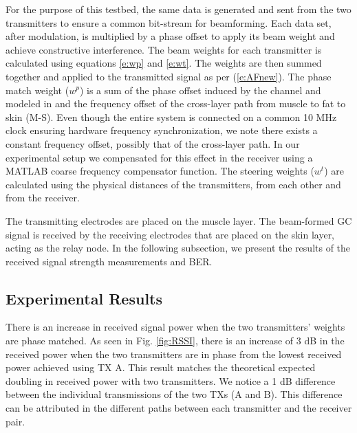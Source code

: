 For the purpose of this testbed, the same data is generated and sent from the two transmitters to ensure a common bit-stream for beamforming. 
Each data set, after modulation, is multiplied by a phase offset to apply its beam weight and achieve constructive interference.
The beam weights for each transmitter is calculated using equations \ref{e:wp} and \ref{e:wt}. The weights are then summed together and applied to the transmitted signal as per (\ref{e:AFnew}). The phase match weight  ($w^p$) is a sum of the phase offset induced by the channel and modeled in \cite{tbiocas} and the frequency offset of the cross-layer path from muscle to fat to skin (M-S).
Even though the entire system is connected on a common 10 MHz clock ensuring hardware frequency synchronization, we note there exists a constant frequency offset, possibly that of the cross-layer path. In our experimental setup we compensated for this effect in the receiver using a MATLAB coarse frequency compensator function. The steering weights ($w^t$) are calculated using the physical distances of the transmitters, from each other and from the receiver.

The transmitting electrodes are placed on the muscle layer. The beam-formed GC signal is received by the receiving electrodes that are placed on the skin layer, acting as the relay node. In the following subsection, we present the results of the received signal strength measurements and BER.

\subsection{Experimental Results}
There is an increase in received signal power when the two transmitters' weights are phase matched. As seen in Fig. \ref{fig:RSSI}, there is an increase of 3 dB in the received power when the two transmitters are in phase from the lowest received power achieved using TX A.
This result matches the theoretical expected doubling in received power with two transmitters. We notice a 1 dB difference between the individual transmissions of the two TXs (A and B). This difference can be attributed in the different paths between each transmitter and the receiver pair.

